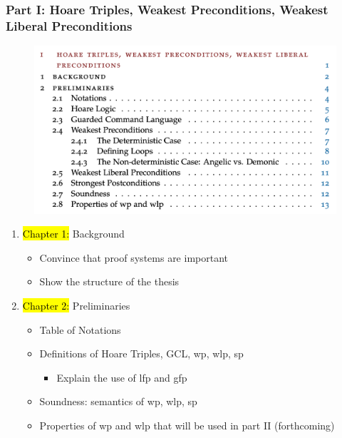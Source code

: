 \documentclass[aspectratio=169]{beamer}
\begin{document}
\begin{frame}[fragile]
	\frametitle{Part I: Hoare Triples, Weakest Preconditions, Weakest Liberal
Preconditions}
	\begin{minipage}[t]{0.49\linewidth}	
		\begin{figure}
			\centering \includegraphics[width=1.1\textwidth]{images/part1.png} 
	  \end{figure}
	\end{minipage}
	\begin{minipage}[t]{0.5\linewidth}
		\begin{enumerate}
			\item[] \hl{Chapter 1: }Background 
			\begin{itemize}
				\item Convince that proof systems are important
				\item Show the structure of the thesis
			\end{itemize}
			\item[] \hl{Chapter 2: }Preliminaries
			\begin{itemize}
				\item Table of Notations 
				\item Definitions of Hoare Triples, GCL, wp, wlp, sp
				\begin{itemize}
					\item Explain the use of lfp and gfp
				\end{itemize}
				\item Soundness: semantics of wp, wlp, sp
				\item Properties of wp and wlp that will be used in part II (forthcoming)
			\end{itemize}
		\end{enumerate}
	\end{minipage}
\end{frame}
\end{document}
